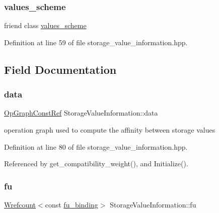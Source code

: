 \subsubsection{\texorpdfstring{values\+\_\+scheme}{values\_scheme}}
{\footnotesize\ttfamily friend class \hyperlink{classvalues__scheme}{values\+\_\+scheme}\hspace{0.3cm}{\ttfamily [friend]}}



Definition at line 59 of file storage\+\_\+value\+\_\+information.\+hpp.



\subsection{Field Documentation}
\mbox{\label{classStorageValueInformation_ac59da92fcdad5a9021d8d63a7cad92ac}} 
\subsubsection{\texorpdfstring{data}{data}}
{\footnotesize\ttfamily \hyperlink{op__graph_8hpp_a9a0b240622c47584bee6951a6f5de746}{Op\+Graph\+Const\+Ref} Storage\+Value\+Information\+::data\hspace{0.3cm}{\ttfamily [protected]}}



operation graph used to compute the affinity between storage values 



Definition at line 80 of file storage\+\_\+value\+\_\+information.\+hpp.



Referenced by get\+\_\+compatibility\+\_\+weight(), and Initialize().

\mbox{\label{classStorageValueInformation_a8951bbb3fc2f08b55714349c736f1714}} 
\subsubsection{\texorpdfstring{fu}{fu}}
{\footnotesize\ttfamily \hyperlink{classWrefcount}{Wrefcount}$<$const \hyperlink{classfu__binding}{fu\+\_\+binding}$>$ Storage\+Value\+Information\+::fu\hspace{0.3cm}{\ttfamily [protected]}}



